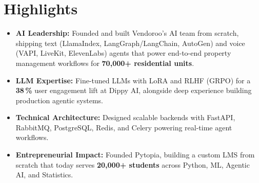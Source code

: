 \section{Highlights}

\begin{itemize}
  \item \textbf{AI Leadership:} Founded and built Vendoroo's AI team from scratch, shipping text
        (LlamaIndex, LangGraph/LangChain, AutoGen) and voice (VAPI, LiveKit, ElevenLabs) agents that
        power end-to-end property management workflows for \textbf{70{,}000+ residential units}.
  \item \textbf{LLM Expertise:} Fine-tuned LLMs with LoRA and RLHF (GRPO) for a \textbf{38\,\%} user
        engagement lift at Dippy AI, alongside deep experience building production agentic systems.
  \item \textbf{Technical Architecture:} Designed scalable backends with FastAPI, RabbitMQ,
        PostgreSQL, Redis, and Celery powering real-time agent workflows.
  \item \textbf{Entrepreneurial Impact:} Founded Pytopia, building a custom LMS from scratch that
        today serves \textbf{20{,}000+ students} across Python, ML, Agentic AI, and Statistics.
\end{itemize}
